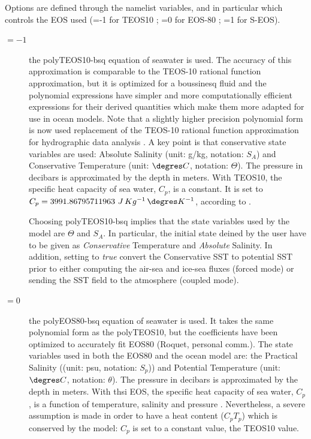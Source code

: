Options are defined through the   namelist variables, and in particular  
which controls the EOS used (=-1 for TEOS10 ; =0 for EOS-80 ; =1 for S-EOS).
\begin{description}

\item[$=-1$] the polyTEOS10-bsq equation of seawater \citep{Roquet_OM2015} is used.  
The accuracy of this approximation is comparable to the TEOS-10 rational function approximation, 
but it is optimized for a boussinesq fluid and the polynomial expressions have simpler 
and more computationally efficient expressions for their derived quantities 
which make them more adapted for use in ocean models. 
Note that a slightly higher precision polynomial form is now used replacement of the TEOS-10 
rational function approximation for hydrographic data analysis  \citep{TEOS10}. 
A key point is that conservative state variables are used: 
Absolute Salinity (unit: g/kg, notation: $S_A$) and Conservative Temperature (unit: $\degres C$, notation: $\Theta$).
The pressure in decibars is approximated by the depth in meters. 
With TEOS10, the specific heat capacity of sea water, $C_p$, is a constant. It is set to 
$C_p=3991.86795711963~J\,Kg^{-1}\,\degres K^{-1}$, according to \citet{TEOS10}.

Choosing polyTEOS10-bsq implies that the state variables used by the model are 
$\Theta$ and $S_A$. In particular, the initial state deined by the user have to be given as 
\textit{Conservative} Temperature and \textit{Absolute} Salinity. 
In addition, setting  to \textit{true} convert the Conservative SST to potential SST 
prior to either computing the air-sea and ice-sea fluxes (forced mode) 
or sending the SST field to the atmosphere (coupled mode).

\item[$=0$] the polyEOS80-bsq equation of seawater is used.
It takes the same polynomial form as the polyTEOS10, but the coefficients have been optimized 
to accurately fit EOS80 (Roquet, personal comm.). The state variables used in both the EOS80 
and the ocean model are: 
the Practical Salinity ((unit: psu, notation: $S_p$)) and Potential Temperature (unit: $\degres C$, notation: $\theta$).
The pressure in decibars is approximated by the depth in meters.  
With thsi EOS, the specific heat capacity of sea water, $C_p$, is a function of temperature, 
salinity and pressure \citep{UNESCO1983}. Nevertheless, a severe assumption is made in order to 
have a heat content ($C_p T_p$) which is conserved by the model: $C_p$ is set to a constant 
value, the TEOS10 value. 
 

\end{description}
